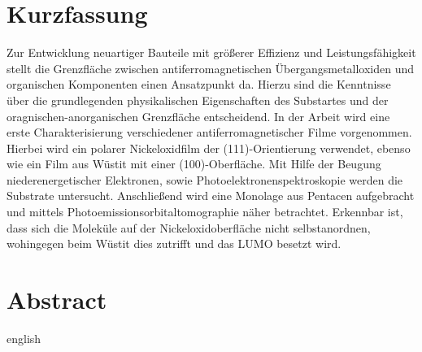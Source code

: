\thispagestyle{plain}

\section*{Kurzfassung}
Zur Entwicklung neuartiger Bauteile mit größerer Effizienz und Leistungsfähigkeit stellt die Grenzfläche zwischen antiferromagnetischen Übergangsmetalloxiden und organischen Komponenten einen Ansatzpunkt da.
Hierzu sind die Kenntnisse über die grundlegenden physikalischen Eigenschaften des Substartes und der oragnischen-anorganischen Grenzfläche entscheidend.
In der Arbeit wird eine erste Charakterisierung verschiedener antiferromagnetischer Filme vorgenommen.
Hierbei wird ein polarer Nickeloxidfilm der (111)-Orientierung verwendet, ebenso wie ein Film aus Wüstit mit einer (100)-Oberfläche.
Mit Hilfe der Beugung niederenergetischer Elektronen, sowie Photoelektronenspektroskopie werden die Substrate untersucht.
Anschließend wird eine Monolage aus Pentacen aufgebracht und mittels Photoemissionsorbitaltomographie näher betrachtet.
Erkennbar ist, dass sich die Moleküle auf der Nickeloxidoberfläche nicht selbstanordnen, wohingegen beim Wüstit dies zutrifft und das LUMO besetzt wird.

\section*{Abstract}
\begin{foreignlanguage}{english}

\end{foreignlanguage}
